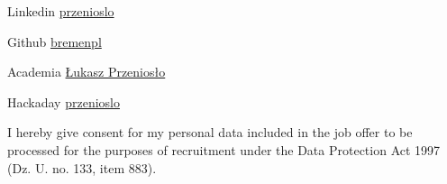 \documentclass{tccv}
\begin{document}
\begin{factlist}

\item{Linkedin}
     {\href{http://pl.linkedin.com/in/przenioslo}{przenioslo}}
     
\item{Github}
     {\href{http://github.com/bremenpl}{bremenpl}}
     
\item{Academia}
     {\href{https://zut.academia.edu/\%C5\%81ukaszPrzenios\%C5\%82o}{Łukasz Przeniosło}}
     
\item{Hackaday}
     {\href{http://hackaday.io/przenioslo}{przenioslo}}  

\end{factlist} 

{\scriptsize I hereby give consent for my personal data included in the job offer to be processed for the purposes of recruitment under the Data Protection Act 1997 (Dz. U. no. 133, item 883).}
\end{document}
